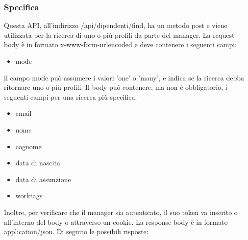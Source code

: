 \documentclass{report}
\begin{document}
\subsubsection*{Specifica}
Questa API, all'indirizzo /api/dipendenti/find, ha un metodo post e viene utilizzata per la ricerca di uno o più profili da parte del manager.
La request body è in formato x-www-form-urlencoded e deve contenere i seguenti campi:
\begin{itemize}
	\item mode
\end{itemize}
il campo mode può assumere i valori 'one' o 'many', e indica se la ricerca debba ritornare uno o più profili.
Il body può contenere, ma non è obbligatorio, i seguenti campi per una ricerca più specifica:
\begin{itemize}
	\item email
	\item nome
	\item cognome
	\item data di nascita
	\item data di assunzione
	\item worktags
\end{itemize}
Inoltre, per verificare che il manager sia autenticato, il suo token va inserito o all'interno del body o attraverso un cookie.
La response body è in formato application/json. Di seguito le possibili risposte:
\end{document}
